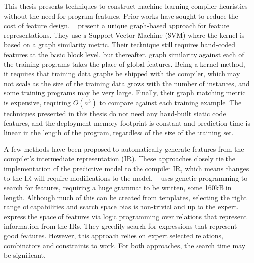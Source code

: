 This thesis presents techniques to construct machine learning compiler heuristics without the need for program features. Prior works have sought to reduce the cost of feature design.
\citeauthor{Park2012}~\cite{Park2012} present a unique graph-based approach for feature representations. They use a Support Vector Machine (SVM) where the kernel is based on a graph similarity metric. Their technique still requires hand-coded features at the basic block level, but thereafter, graph similarity against each of the training programs takes the place of global features. Being a kernel method, it requires that training data graphs be shipped with the compiler, which may not scale as the size of the training data grows with the number of instances, and some training programs may be very large. Finally, their graph matching metric is expensive, requiring $O(n^3)$ to compare against each training example. The techniques presented in this thesis do not need any hand-built static code features, and the deployment memory footprint is constant and prediction time is linear in the length of the program, regardless of the size of the training set.

A few methods have been proposed to automatically generate features from the compiler's intermediate representation (IR). These approaches closely tie the implementation of the predictive model to the compiler IR, which means changes to the IR will require modifications to the model.
\citeauthor{Leather2014}~\cite{Leather2014} uses genetic programming to search for features, requiring a huge grammar to be written, some 160kB in length. Although much of this can be created from templates, selecting the right range of capabilities and search space bias is non-trivial and up to the expert.
\citeauthor{Namolaru2010a}~\cite{Namolaru2010a} express the space of features via logic programming over relations that represent information from the IRs. They greedily search for expressions that represent good features. However, this approach relies on expert selected relations, combinators and constraints to work. For both approaches, the search time may be significant.

